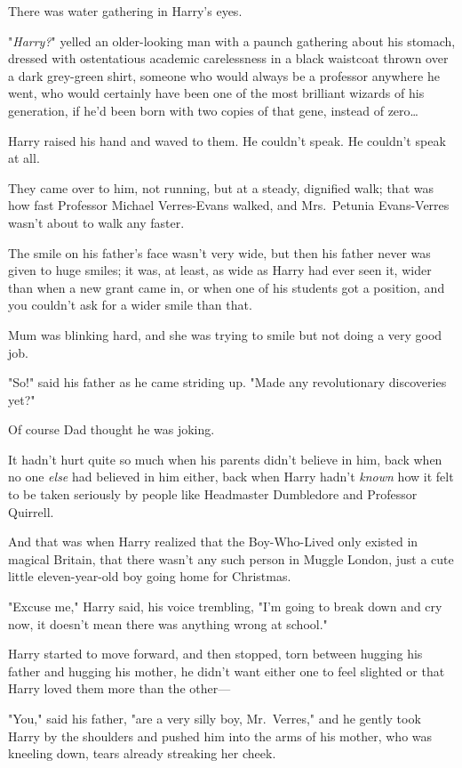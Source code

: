 There was water gathering in Harry's eyes.

"\emph{Harry?}" yelled an older-looking man with a paunch gathering about his
stomach, dressed with ostentatious academic carelessness in a black waistcoat thrown
over a dark grey-green shirt, someone who would always be a professor anywhere
he went, who would certainly have been one of the most brilliant wizards of his
generation, if he'd been born with two copies of that gene, instead of
zero{\ldots}

Harry raised his hand and waved to them. He couldn't speak. He couldn't speak
at all.

They came over to him, not running, but at a steady, dignified walk; that was
how fast Professor Michael Verres-Evans walked, and Mrs.~Petunia Evans-Verres
wasn't about to walk any faster.

The smile on his father's face wasn't very wide, but then his father never was
given to huge smiles; it was, at least, as wide as Harry had ever seen it,
wider than when a new grant came in, or when one of his students got a
position, and you couldn't ask for a wider smile than that.

Mum was blinking hard, and she was trying to smile but not doing a very good
job.

"So!" said his father as he came striding up. "Made any revolutionary
discoveries yet?"

Of course Dad thought he was joking.

It hadn't hurt quite so much when his parents didn't believe in him, back when
no one \emph{else} had believed in him either, back when Harry hadn't
\emph{known} how it felt to be taken seriously by people like Headmaster
Dumbledore and Professor Quirrell.

And that was when Harry realized that the Boy-Who-Lived only existed in magical
Britain, that there wasn't any such person in Muggle London, just a cute little
eleven-year-old boy going home for Christmas.

"Excuse me," Harry said, his voice trembling, "I'm going to break down and cry
now, it doesn't mean there was anything wrong at school."

Harry started to move forward, and then stopped, torn between hugging his
father and hugging his mother, he didn't want either one to feel slighted or
that Harry loved them more than the other---

"You," said his father, "are a very silly boy, Mr.~Verres," and he gently took
Harry by the shoulders and pushed him into the arms of his mother, who was
kneeling down, tears already streaking her cheek.

